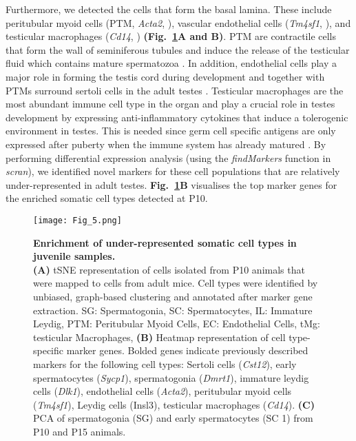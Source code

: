 Furthermore, we detected the cells that form the basal lamina. These include peritubular myoid cells (PTM, \textit{Acta2}, \citep{Cool2008}), vascular endothelial cells (\textit{Tm4sf1}, \citep{Shih2009}), and testicular macrophages (\textit{Cd14}, \citep{Kitchens2000}) \textbf{(Fig.~\ref{fig3:somatic_cells}A and B)}. PTM are contractile cells that form the wall of seminiferous tubules and induce the release of the testicular fluid which contains mature spermatozoa \citep{Diez-Torre2011}. In addition, endothelial cells play a major role in forming the testis cord during development and together with PTMs surround sertoli cells in the adult testes \citep{Combes2009}. Testicular macrophages are the most abundant immune cell type in the organ and play a crucial role in testes development by expressing anti-inflammatory cytokines that induce a tolerogenic environment in testes. This is needed since germ cell specific antigens are only expressed after puberty when the immune system has already matured \citep{Fijak2006}. By performing differential expression analysis (using the \emph{findMarkers} function in \emph{scran}), we identified novel markers for these cell populations that are relatively under-represented in adult testes. \textbf{Fig.~\ref{fig3:somatic_cells}B} visualises the top marker genes for the enriched somatic cell types detected at P10.\\

\begin{figure}[!h]
\centering
\texttt{[image: Fig\_5.png]}
\caption[Enrichment of under-represented somatic cell types in juvenile samples]{\textbf{Enrichment of under-represented somatic cell types in juvenile samples.} \\
\textbf{(A)} tSNE representation of cells isolated from P10 animals that were mapped to cells from adult mice. Cell types were identified by unbiased, graph-based clustering and annotated after marker gene extraction. SG: Spermatogonia, SC: Spermatocytes, IL: Immature Leydig, PTM: Peritubular Myoid Cells, EC: Endothelial Cells, tMg: testicular Macrophages, \textbf{(B)} Heatmap representation of cell type-specific marker genes. Bolded genes indicate previously described markers for the following cell types: Sertoli cells (\textit{Cst12}), early spermatocytes (\textit{Sycp1}), spermatogonia (\textit{Dmrt1}), immature leydig cells (\textit{Dlk1}), endothelial cells (\textit{Acta2}), peritubular myoid cells (\textit{Tm4sf1}), Leydig cells (Insl3), testicular macrophages (\textit{Cd14}). \textbf{(C)} PCA of spermatogonia (SG) and early spermatocytes (SC 1) from P10 and P15 animals. 
}
\label{fig3:somatic_cells}
\end{figure}

